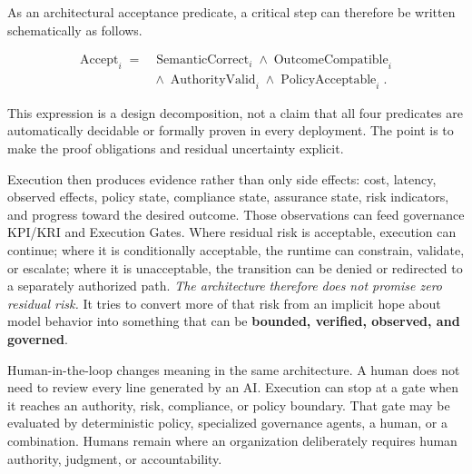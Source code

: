 \documentclass[10pt,oneside,openany]{book}
\begin{document}
As an architectural acceptance predicate, a critical step can therefore be written schematically as follows.
\begin{formulabox}
\[
\begin{aligned}
\operatorname{Accept}_i ={}&
\operatorname{SemanticCorrect}_i \land
\operatorname{OutcomeCompatible}_i\\
&{}\land \operatorname{AuthorityValid}_i \land
\operatorname{PolicyAcceptable}_i.
\end{aligned}
\]
\end{formulabox}
This expression is a design decomposition, not a claim that all four predicates are automatically decidable or formally proven in every deployment. The point is to make the proof obligations and residual uncertainty explicit.

Execution then produces evidence rather than only side effects: cost, latency, observed effects, policy state, compliance state, assurance state, risk indicators, and progress toward the desired outcome. Those observations can feed governance KPI/KRI and Execution Gates. Where residual risk is acceptable, execution can continue; where it is conditionally acceptable, the runtime can constrain, validate, or escalate; where it is unacceptable, the transition can be denied or redirected to a separately authorized path. \emph{The architecture therefore does not promise zero residual risk.} It tries to convert more of that risk from an implicit hope about model behavior into something that can be \textbf{bounded, verified, observed, and governed}.

Human-in-the-loop changes meaning in the same architecture. A human does not need to review every line generated by an AI. Execution can stop at a gate when it reaches an authority, risk, compliance, or policy boundary. That gate may be evaluated by deterministic policy, specialized governance agents, a human, or a combination. Humans remain where an organization deliberately requires human authority, judgment, or accountability.
\end{document}
